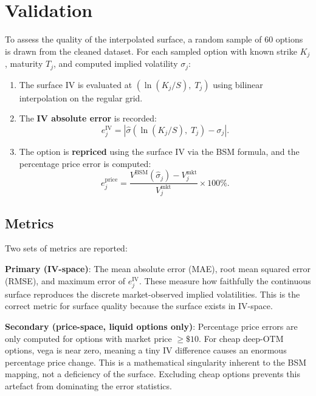 \documentclass[12pt, a4paper]{article}
\begin{document}
\section{Validation}
\label{sec:validation}

To assess the quality of the interpolated surface, a random sample of 60 options
is drawn from the cleaned dataset. For each sampled option with known strike
$K_j$, maturity $T_j$, and computed implied volatility $\sigma_j$:

\begin{enumerate}[nosep]
    \item The surface IV is evaluated at $(\ln(K_j/S),\; T_j)$ using bilinear
          interpolation on the regular grid.
    \item The \textbf{IV absolute error} is recorded:
          \begin{equation}
              e_j^{\text{IV}} = |\hat{\sigma}(\ln(K_j/S),\; T_j) - \sigma_j|.
              \label{eq:iv_err}
          \end{equation}
    \item The option is \textbf{repriced} using the surface IV via the BSM
          formula, and the percentage price error is computed:
          \begin{equation}
              e_j^{\text{price}} = \frac{V^{\text{BSM}}(\hat{\sigma}_j) - V_j^{\text{mkt}}}{V_j^{\text{mkt}}} \times 100\%.
              \label{eq:price_err}
          \end{equation}
\end{enumerate}

\subsection{Metrics}

Two sets of metrics are reported:

\textbf{Primary (IV-space)}: The mean absolute error (MAE), root mean squared
error (RMSE), and maximum error of $e_j^{\text{IV}}$. These measure how
faithfully the continuous surface reproduces the discrete market-observed
implied volatilities. This is the correct metric for surface quality because the
surface exists in IV-space.

\textbf{Secondary (price-space, liquid options only)}: Percentage price errors
are only computed for options with market price $\geq \$10$. For cheap deep-OTM
options, vega is near zero, meaning a tiny IV difference causes an enormous
percentage price change. This is a mathematical singularity inherent to the
BSM mapping, not a deficiency of the surface. Excluding cheap options prevents
this artefact from dominating the error statistics.
\end{document}
